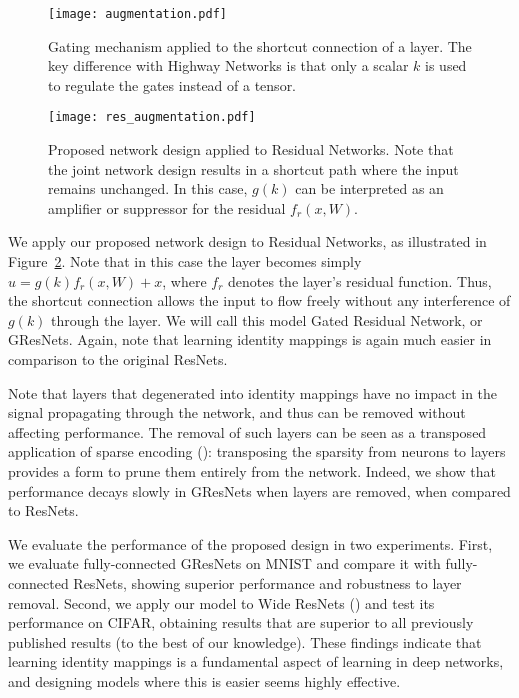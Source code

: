 \documentclass{article} \RequirePackage{amsmath,amsthm,amsfonts,amssymb}
\begin{document}
\begin{figure}[!ht]
  \centering
    \texttt{[image: augmentation.pdf]}
  \caption{Gating mechanism applied to the shortcut connection of a layer. The key difference with Highway Networks is that only a scalar $k$ is used to regulate the gates instead of a tensor.}
\label{aug}
\end{figure}

\begin{figure}[!ht]
  \centering
    \texttt{[image: res\_augmentation.pdf]}
  \caption{Proposed network design applied to Residual Networks. Note that the joint network design results in a shortcut path where the input remains unchanged. In this case, $g(k)$ can be interpreted as an amplifier or suppressor for the residual $f_r(x,W)$.}
\label{resaug}
\end{figure}







We apply our proposed network design to Residual Networks, as illustrated in Figure~\ref{resaug}. Note that in this case the layer becomes simply $u = g(k) f_r(x,W) + x$, where $f_r$ denotes the layer's residual function. Thus, the shortcut connection allows the input to flow freely without any interference of $g(k)$ through the layer. We will call this model Gated Residual Network, or GResNets. Again, note that learning identity mappings is again much easier in comparison to the original ResNets. 




Note that layers that degenerated into identity mappings have no impact in the signal propagating through the network, and thus can be removed without affecting performance. The removal of such layers can be seen as a transposed application of sparse encoding (\cite{sparse}): transposing the sparsity from neurons to layers provides a form to prune them entirely from the network. Indeed, we show that performance decays slowly in GResNets when layers are removed, when compared to ResNets.



We evaluate the performance of the proposed design in two experiments. First, we evaluate fully-connected GResNets on MNIST and compare it with fully-connected ResNets, showing superior performance and robustness to layer removal. Second, we apply our model to Wide ResNets (\cite{wide}) and test its performance on CIFAR, obtaining results that are superior to all previously published results (to the best of our knowledge). These findings indicate that learning identity mappings is a fundamental aspect of learning in deep networks, and designing models where this is easier seems highly effective.
\end{document}
